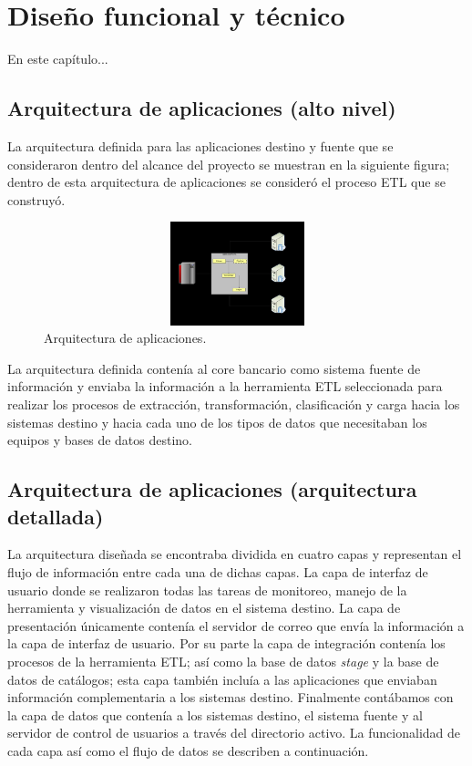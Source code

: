 \chapter{Diseño funcional y técnico}
\label{cap:diseno-funcional}

En este capítulo...

\section{Arquitectura de aplicaciones (alto nivel)}

La arquitectura definida para las aplicaciones destino y fuente que se
consideraron dentro del alcance del proyecto se muestran en la siguiente figura;
dentro de esta arquitectura de aplicaciones se consideró el proceso ETL que se
construyó.

\begin{figure}[htb]
  \begin{center}
    \includegraphics[width=12cm, height=3cm, scale=0.5]{Arquitectura.jpg}
        \caption{Arquitectura de aplicaciones.}
    \label{fig:arquitectura}
  \end{center}
\end{figure}

La arquitectura definida contenía al core bancario como sistema fuente de
información y enviaba la información a la herramienta ETL seleccionada para
realizar los procesos de extracción, transformación, clasificación y carga hacia
los sistemas destino y hacia cada uno de los tipos de datos que necesitaban los
equipos y bases de datos destino.

\section{Arquitectura de aplicaciones (arquitectura detallada)}

La arquitectura diseñada se encontraba dividida en cuatro capas y representan el
flujo de información entre cada una de dichas capas. La capa de interfaz de
usuario donde se realizaron todas las tareas de monitoreo, manejo de la
herramienta y visualización de datos en el sistema destino. La capa de
presentación únicamente contenía el servidor de correo que envía la información
a la capa de interfaz de usuario. Por su parte la capa de integración contenía
los procesos de la herramienta ETL; así como la base de datos \emph{stage} y la
base de datos de catálogos; esta capa también incluía a las aplicaciones que
enviaban información complementaria a los sistemas destino. Finalmente
contábamos con la capa de datos que contenía a los sistemas destino, el sistema
fuente y al servidor de control de usuarios a través del directorio activo. La
funcionalidad de cada capa así como el flujo de datos se describen a
continuación.

